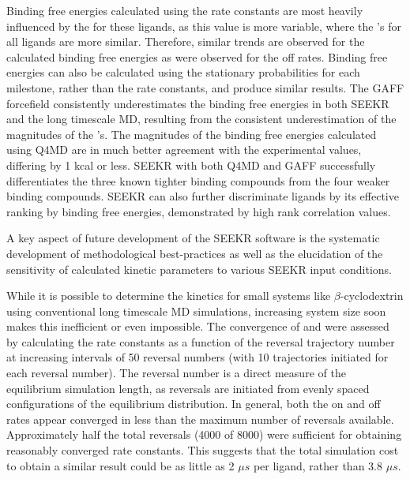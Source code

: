 Binding free energies calculated using the rate constants
are most heavily influenced by the \koff for these ligands, as this value is more variable, where
the \kon's for all ligands are more similar. Therefore, similar trends are observed
for the calculated binding free energies as were observed for the off rates.
Binding free energies can also be calculated using the stationary probabilities
for each milestone, rather than the rate constants, and produce similar results.
The GAFF forcefield consistently underestimates the binding free energies in both
SEEKR and the long timescale MD, resulting from the consistent underestimation
of the magnitudes of the \koff's. The magnitudes of the binding free
energies calculated using Q4MD are in much better agreement with the experimental
values, differing by 1 kcal or less. SEEKR with both Q4MD and GAFF successfully
differentiates the three known tighter binding compounds from the four weaker binding compounds.
SEEKR can also further discriminate ligands
by its effective ranking %
by binding free energies, demonstrated by high rank correlation values.


\par A key aspect of future development of the SEEKR software is the systematic
development of methodological best-practices as well as the elucidation of the
sensitivity of calculated kinetic parameters to various SEEKR input conditions.

While it is possible to determine the kinetics for small systems like
$\beta$-cyclodextrin using conventional long timescale MD simulations, increasing
system size soon makes this inefficient or even impossible.
The convergence of \kon and \koff were assessed by calculating the rate
constants as a function of the reversal trajectory number at increasing intervals
of 50 reversal numbers (with 10 trajectories initiated for each reversal number).
The reversal number is a direct measure of the equilibrium simulation length, as
reversals are initiated from evenly spaced configurations of the equilibrium distribution.
In general, both the on and off rates appear converged in less than the maximum
number of reversals available. Approximately half the total reversals
(4000 of 8000) were sufficient for obtaining reasonably converged rate constants.
This suggests that the total simulation cost to obtain a similar result could be
as little as 2 ${\mu}s$ per ligand, rather than 3.8 ${\mu}s$.

